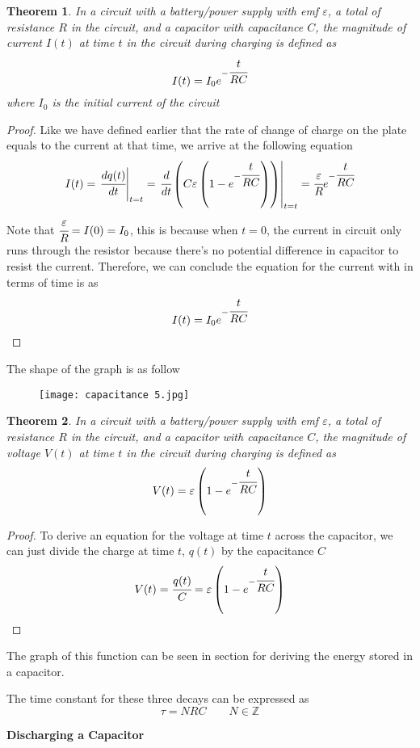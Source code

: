 \documentclass{article}
\newtheorem{theorem}{Theorem}[subsection]
\begin{document}
\begin{theorem}
In a circuit with a battery/power supply with emf $\varepsilon$, a total of resistance $R$ in the circuit, and a capacitor with capacitance $C$, the magnitude of current $I(t)$ at time $t$ in the circuit during charging is defined as
$$I(t)=I_0e^{-\cfrac{t}{RC}}$$
where $I_0$ is the initial current of the circuit
\end{theorem}

\begin{proof}
Like we have defined earlier that the rate of change of charge on the plate equals to the current at that time, we arrive at the following equation
$$I(t)=\left.\cfrac{dq(t)}{dt}\right|_{t=t}=\left.\cfrac{d}{dt}\left(C\varepsilon\left(1-e^{-\cfrac{t}{RC}}\right)\right)\right|_{t=t}=\cfrac{\varepsilon}{R}e^{-\cfrac{t}{RC}} $$
Note that $\cfrac{\varepsilon}{R}=I(0)=I_0$, this is because when $t=0$, the current in circuit only runs through the resistor because there's no potential difference in capacitor to resist the current. Therefore, we can conclude the equation for the current with in terms of time is as
$$I(t)=I_0e^{-\cfrac{t}{RC}}$$
\end{proof}

The shape of the graph is as follow
\begin{figure}[H]
    \centering
    \texttt{[image: capacitance 5.jpg]}
\end{figure}

\begin{theorem}
In a circuit with a battery/power supply with emf $\varepsilon$, a total of resistance $R$ in the circuit, and a capacitor with capacitance $C$, the magnitude of voltage $V(t)$ at time $t$ in the circuit during charging is defined as
$$V(t)=\varepsilon\left(1- e^{-\cfrac{t}{RC}}\right)$$
\end{theorem}

\begin{proof}
To derive an equation for the voltage at time $t$ across the capacitor, we can just divide the charge at time $t$, $q(t)$ by the capacitance $C$
$$V(t)=\cfrac{q(t)}{C}=\varepsilon\left(1- e^{-\cfrac{t}{RC}}\right)$$
\end{proof}
The graph of this function can be seen in section for deriving the energy stored in a capacitor.

The time constant for these three decays can be expressed as 
$$\tau=NRC \quad\quad N\in\mathbb{Z}$$
\begin{flushleft}
\textbf{Discharging a Capacitor}
\end{flushleft}
\end{document}
